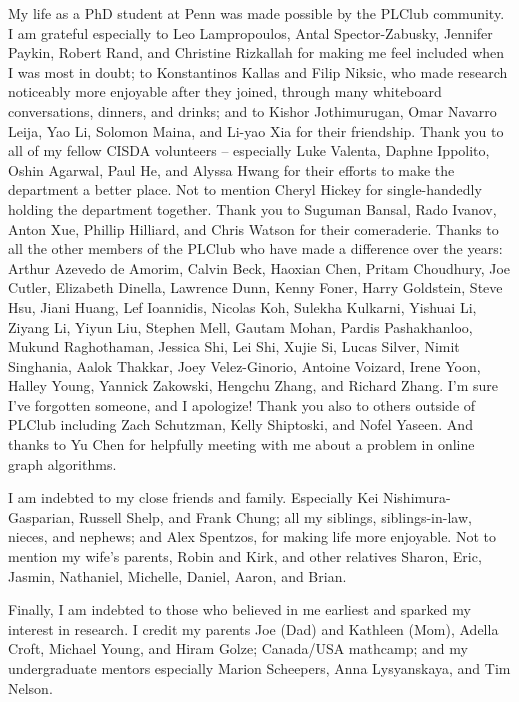 My life as a PhD student at Penn was made possible by the PLClub community.
I am grateful especially to Leo Lampropoulos, Antal Spector-Zabusky, Jennifer Paykin, Robert Rand, ‪and Christine Rizkallah for making me feel included when I was most in doubt;
to Konstantinos Kallas and Filip Niksic, who made research noticeably more enjoyable after they joined, through many whiteboard conversations, dinners, and drinks;
and to Kishor Jothimurugan, Omar Navarro Leija, Yao Li, Solomon Maina, and Li-yao Xia for their friendship.
Thank you to all of my fellow CISDA volunteers -- especially Luke Valenta, Daphne Ippolito, Oshin Agarwal, Paul He, and Alyssa Hwang for their efforts to make the department a better place.
Not to mention Cheryl Hickey for single-handedly holding the department together.
Thank you to Suguman Bansal, Rado Ivanov, Anton Xue, Phillip Hilliard, and Chris Watson for their comeraderie.
Thanks to all the other members of the PLClub who have made a difference over the years:
Arthur Azevedo de Amorim,
Calvin Beck,
Haoxian Chen,
Pritam Choudhury,
Joe Cutler,
Elizabeth Dinella,
Lawrence Dunn,
Kenny Foner,
Harry Goldstein,
Steve Hsu,
Jiani Huang,
Lef Ioannidis,
Nicolas Koh,
Sulekha Kulkarni,
Yishuai Li,
Ziyang Li,
Yiyun Liu,
Stephen Mell,
Gautam Mohan,
Pardis Pashakhanloo,
Mukund Raghothaman,
Jessica Shi,
Lei Shi,
Xujie Si,
Lucas Silver,
Nimit Singhania,
Aalok Thakkar,
Joey Velez-Ginorio,
Antoine Voizard,
Irene Yoon,
Halley Young,
Yannick Zakowski,
Hengchu Zhang,
and
Richard Zhang.
I'm sure I've forgotten someone, and I apologize!
Thank you also to others outside of PLClub including Zach Schutzman, Kelly Shiptoski, and Nofel Yaseen.
And thanks to Yu Chen for helpfully meeting with me about a problem in online graph algorithms.

I am indebted to my close friends and family. Especially Kei Nishimura-Gasparian, Russell Shelp, and Frank Chung; all my siblings, siblings-in-law, nieces, and nephews; and Alex Spentzos, for making life more enjoyable.
Not to mention my wife's parents, Robin and Kirk, and other relatives Sharon, Eric, Jasmin, Nathaniel, Michelle, Daniel, Aaron, and Brian.

Finally, I am indebted to those who believed in me earliest and sparked my interest in research.
I credit my parents Joe (Dad) and Kathleen (Mom),
Adella Croft, Michael Young, and Hiram Golze;
Canada/USA mathcamp;
and my undergraduate mentors especially Marion Scheepers, Anna Lysyanskaya, and Tim Nelson.
